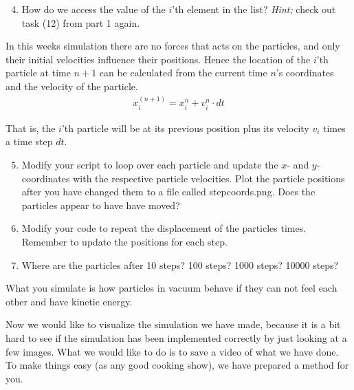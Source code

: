 \documentclass{article}
\begin{document}
\begin{enumerate}
  \setcounter{enumi}{3}
  \item How do we access the value of the $i$'th element in the  list?
      {\em Hint;} check out task (12) from part 1 again.

\end{enumerate}

In this weeks simulation there are no forces that acts on the particles, and only their initial velocities influence their positions.
Hence the location of the $i$'th particle at time $n+1$ can be calculated from the current time $n$'s coordinates and the velocity of the
particle.
\begin{align}
  x_i^{(n+1)} = x^n_i + v_{i}^n \cdot dt
\end{align}

That is, the $i$'th particle will be at its previous position plus its velocity $v_i$ times a time step $dt$.

\begin{enumerate}
  \setcounter{enumi}{4}
  \item
    Modify your script to loop over each particle and update the $x$- and $y$-coordinates with the respective particle velocities.
    Plot the particle positions after you have changed them to a file called stepcoords.png.
    Does the particles appear to have have moved?

  \item Modify your code to repeat the displacement of the particles  times.
      Remember to update the positions for each step.

  \item Where are the particles after 10 steps? 100 steps? 1000 steps? 10000 steps?

\end{enumerate}

What you simulate is how particles in vacuum behave if they can not feel each other and have kinetic energy.\\

\newpage

Now we would like to visualize the simulation we have made, because it is a bit hard to see if the simulation has been implemented correctly by just looking at a few images.
What we would like to do is to save a video of what we have done.
To make things easy (as any good cooking show), we have prepared a method for you.\\
\end{document}
